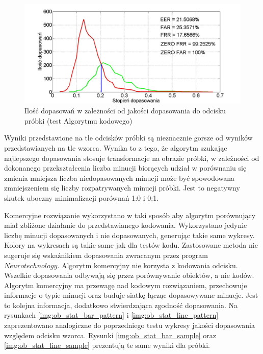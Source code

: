 \begin{figure}[!htb]
    \begin{center}
		\includegraphics[angle=0,scale=0.27]{img/sample_line_statistic_analyses_code_way.jpg}
		\caption{Ilość dopasowań w zależności od jakości dopasowania do odcisku próbki (test Algorytmu kodowego)}
		\label{img:code_stat_line_sample}
    \end{center}
\end{figure} 
Wyniki przedstawione na tle odcisków próbki są nieznacznie gorsze od wyników przedstawianych na tle wzorca. Wynika to z tego, że algorytm szukając najlepszego dopasowania stosuje transformacje na obrazie próbki, w zależności od dokonanego przekształcenia liczba minucji biorących udział w porównaniu się zmienia mniejsza liczba niedopasowanych minucji może być spowodowana zmniejszeniem się liczby rozpatrywanych minucji próbki. Jest to negatywny skutek uboczny minimalizacji porównań 1:0 i 0:1.
\vspace{.5cm}\par
Komercyjne rozwiązanie wykorzystano w taki sposób aby algorytm porównujący miał zbliżone działanie do przedstawianego kodowania. Wykorzystano jedynie liczbę minucji dopasowanych i nie dopasowanych, generując takie same wykresy. Kolory na wykresach są takie same jak dla testów kodu. Zastosowane metoda nie sugeruje się wskaźnikiem dopasowania zwracanym przez program $Neurotechnology$. Algorytm komercyjny nie korzysta z kodowania odcisku. Wszelkie dopasowania odbywają się przez porównywanie obiektów, a nie kodów. Algorytm komercyjny ma przewagę nad kodowym rozwiązaniem, przechowuje informacje o typie minucji oraz buduje siatkę łącząc dopasowywane minucje. Jest to kolejna informacja, dodatkowo stwierdzająca zgodność dopasowania. Na rysunkach \ref{img:ob_stat_bar_pattern} i \ref{img:ob_stat_line_pattern} zaprezentowano analogiczne do poprzedniego testu wykresy jakości dopasowania względem odcisku wzorca. Rysunki \ref{img:ob_stat_bar_sample} oraz \ref{img:ob_stat_line_sample} prezentują te same wyniki dla próbki. 
